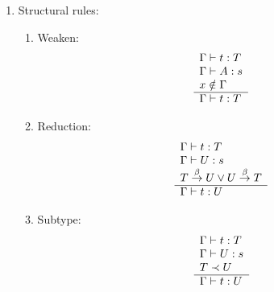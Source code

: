\begin{definition}
\begin{enumerate}
    \item Structural rules:
        \begin{enumerate}
        \item Weaken:
            $$
            \begin{array}{l} 
                \Gamma \vdash t: T
                \\
                \Gamma \vdash A: s
                \\
                x \notin \Gamma
             \\ \hline 
                \Gamma \vdash t: T
            \end{array}
            $$

        \item Reduction:
            $$
            \begin{array}{l} 
                \Gamma \vdash t: T
                \\
                \Gamma \vdash U: s
                \\
                T \stackrel{\beta}{\to} U \lor U \stackrel{\beta}{\to} T
             \\ \hline 
                \Gamma \vdash t: U
            \end{array}
            $$

        \item Subtype:
            $$
            \begin{array}{l} 
                \Gamma \vdash t: T
                \\
                \Gamma \vdash U: s
                \\
                T \prec U
             \\ \hline 
                \Gamma \vdash t: U
            \end{array}
            $$
        \end{enumerate}

    \end{enumerate}
\end{definition}
